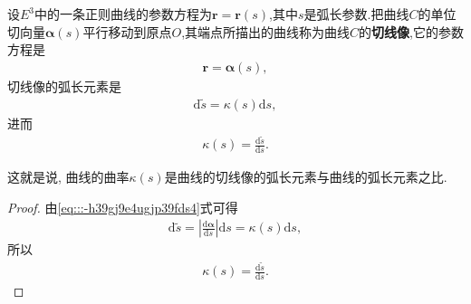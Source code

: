 \documentclass[../../main.tex]{subfiles}%
\begin{document}
\begin{theorem}
设$E^3$中的一条正则曲线的参数方程为$\bm{r}=\bm{r}(s)$,其中$s$是弧长参数.把曲线$C$的单位切向量$\bm{\alpha}(s)$平行移动到原点$O$,其端点所描出的曲线称为曲线$C$的\textbf{切线像},它的参数方程是
\begin{align}
\bm{r} = \bm{\alpha}(s),
\label{eq:::-h39gj9e4ugjp39fds4}
\end{align}
切线像的弧长元素是
\begin{align*}
\mathrm{d}\tilde{s} = \kappa(s)\mathrm{d}s,
\end{align*}
进而
\begin{align*}
\kappa(s) = \frac{\mathrm{d}\tilde{s}}{\mathrm{d}s}.
\end{align*}
\end{theorem}
\begin{remark}
这就是说, 曲线的曲率$\kappa(s)$是曲线的切线像的弧长元素与曲线的弧长元素之比.
\end{remark}
\begin{proof}
由\eqref{eq:::-h39gj9e4ugjp39fds4}式可得
\begin{align*}
\mathrm{d}\tilde{s} = \left| \frac{\mathrm{d}\bm{\alpha}}{\mathrm{d}s} \right| \mathrm{d}s = \kappa(s)\mathrm{d}s,
\end{align*}
所以
\begin{align*}
\kappa(s) = \frac{\mathrm{d}\tilde{s}}{\mathrm{d}s}.
\end{align*}
\end{proof}
\end{document}
